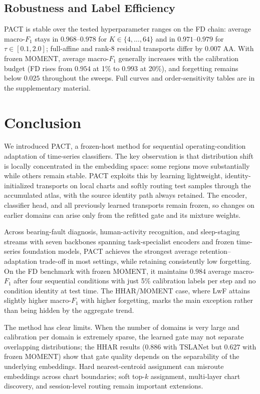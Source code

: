 \documentclass[letterpaper]{article} %
\begin{document}
\subsection{Robustness and Label Efficiency}
\label{sec:robustness}
PACT is stable over the tested hyperparameter ranges on the FD chain:
average macro-$F_1$ stays in $0.968$--$0.978$ for
$K\in\{4,\dots,64\}$ and in $0.971$--$0.979$ for
$\tau\in[0.1,2.0]$; full-affine and rank-8 residual transports differ by
$0.007$ AA.
With frozen MOMENT, average macro-$F_1$ generally increases with the calibration budget
(FD rises from $0.954$ at 1\% to $0.993$ at 20\%), and forgetting remains
below $0.025$ throughout the sweeps. Full curves and order-sensitivity
tables are in the supplementary material.

\section{Conclusion}
\label{sec:conclusion}

We introduced PACT, a frozen-host method for sequential operating-condition
adaptation of time-series classifiers. The key observation is that
distribution shift is locally concentrated in the embedding space: some
regions move substantially while others remain stable. PACT exploits this
by learning lightweight, identity-initialized transports on local charts
and softly routing test samples through the accumulated atlas, with the
source identity path always retained. The encoder, classifier head, and
all previously learned transports remain frozen, so changes on earlier domains
can arise only from the refitted gate and its mixture weights.

Across bearing-fault diagnosis, human-activity recognition, and sleep-staging
streams with seven backbones spanning task-specialist encoders and frozen
time-series foundation models, PACT achieves the strongest average
retention--adaptation trade-off in most settings, while retaining consistently
low forgetting. On the FD benchmark with frozen MOMENT, it maintains $0.984$
average macro-$F_1$ after four sequential conditions with just 5\% calibration
labels per step and no condition identity at test time. The HHAR/MOMENT case,
where LwF attains slightly higher macro-$F_1$ with higher forgetting, marks the
main exception rather than being hidden by the aggregate trend.

The method has clear limits. When the number of domains is very large and
calibration per domain is extremely sparse, the learned gate may not
separate overlapping distributions; the HHAR results ($0.886$ with TSLANet
but $0.627$ with frozen MOMENT) show that gate quality depends on the
separability of the underlying embeddings.
Hard nearest-centroid assignment can misroute embeddings across chart
boundaries; soft top-$k$ assignment, multi-layer chart discovery, and
session-level routing remain important extensions.


\end{document}
